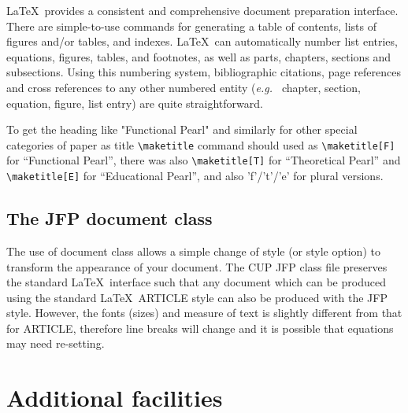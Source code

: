 \documentclass{jfp}
\begin{document}
LaTeX\ provides a consistent and comprehensive document preparation
interface. There are simple-to-use commands for generating a table of
contents, lists of figures and/or tables, and indexes. LaTeX\ can
automatically number list entries, equations, figures, tables, and
footnotes, as well as parts, chapters, sections and subsections.
Using this numbering system, bibliographic citations, page references
and cross references to any other numbered entity ({\it e.g.\ } chapter,
section, equation, figure, list entry) are quite straightforward.

To get the heading like "Functional Pearl" and similarly for other special categories of paper as title \verb"\maketitle" command should used as \verb"\maketitle[F]" for ``Functional Pearl'', there was also \verb"\maketitle[T]" for ``Theoretical Pearl'' and \verb"\maketitle[E]" for ``Educational Pearl'', and also 'f'/'t'/'e' for plural versions.

\subsection{The JFP document class}

The use of document class allows a simple change of style (or style option)
to transform the appearance of your document. The CUP JFP class file preserves
the standard LaTeX\ interface such that any document which can be produced
using the standard LaTeX\ ARTICLE style can also be produced with the
JFP style. However, the fonts (sizes) and measure of text is slightly different
from that for ARTICLE, therefore line breaks will change and it is possible
that equations may need re-setting.

\section{Additional facilities}
\end{document}
